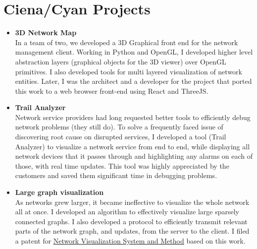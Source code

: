 \documentclass[line, 11pt]{res}
\renewenvironment{resume}{\begingroup}{\endgroup}
\begin{document}
\begin{resume}

\vspace{-12pt}
\section{Ciena/Cyan Projects}
    \begin{itemize}
        \item \textbf{3D Network Map}\\
In a team of two, we developed a 3D Graphical front end for the network management client. Working in Python and OpenGL, I developed higher level abstraction layers (graphical objects for the 3D viewer) over OpenGL primitives. I also developed tools for multi layered visualization of network entities. Later, I was the architect and a developer for the project that ported this work to a web browser front-end using React and ThreeJS.

        \item \textbf{Trail Analyzer}\\
Network service providers had long requested better tools to efficiently debug network problems (they still do). To solve a frequently faced issue of discovering root cause on disrupted services, I developed a tool (Trail Analyzer) to visualize a network service from end to end, while displaying all network devices that it passes through and highlighting any alarms on each of those, with real time updates. This tool was highly appreciated by the customers and saved them significant time in debugging problems.

        \item \textbf{Large graph visualization}\\
As networks grew larger, it became ineffective to visualize the whole network all at once. I developed an algorithm to effectively visualize large sparsely connected graphs. I also developed a protocol to efficiently transmit relevant parts of the network graph, and updates, from the server to the client. I filed a patent for \href{https://patentscope.wipo.int/search/en/detail.jsf?docId=WO2015041751&tab=PCTBIBLIO}{Network Visualization System and Method} based on this work.



\end{itemize}
\end{resume}
\end{document}

